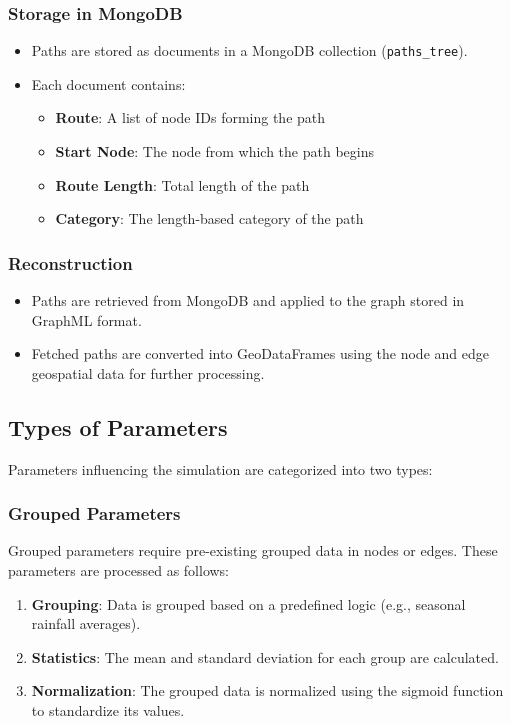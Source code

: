 \documentclass[sigplan,screen]{acmart}
\begin{document}
\subsubsection{Storage in MongoDB}
\begin{itemize}
    \item Paths are stored as documents in a MongoDB collection (\texttt{paths\_tree}).
    \item Each document contains:
    \begin{itemize}
        \item \textbf{Route}: A list of node IDs forming the path
        \item \textbf{Start Node}: The node from which the path begins
        \item \textbf{Route Length}: Total length of the path
        \item \textbf{Category}: The length-based category of the path
    \end{itemize}
\end{itemize}

\subsubsection{Reconstruction}
\begin{itemize}
    \item Paths are retrieved from MongoDB and applied to the graph stored in GraphML format.
    \item Fetched paths are converted into GeoDataFrames using the node and edge geospatial data for further processing.
\end{itemize}

\subsection{Types of Parameters}
Parameters influencing the simulation are categorized into two types:

\subsubsection{Grouped Parameters}
Grouped parameters require pre-existing grouped data in nodes or edges. These parameters are processed as follows:

\begin{enumerate}
    \item \textbf{Grouping}: Data is grouped based on a predefined logic (e.g., seasonal rainfall averages).
    \item \textbf{Statistics}: The mean and standard deviation for each group are calculated.
    \item \textbf{Normalization}: The grouped data is normalized using the sigmoid function to standardize its values.
\end{enumerate}
\end{document}

